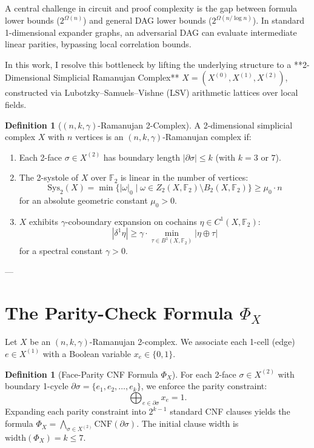 \documentclass[11pt,a4paper]{article}
\theoremstyle{plain}
\theoremstyle{definition}
\newtheorem{definition}[theorem]{Definition}
\theoremstyle{remark}
\begin{document}
A central challenge in circuit and proof complexity is the gap between formula lower bounds ($2^{\Omega(n)}$) and general DAG lower bounds ($2^{\Omega(n / \log n)}$). In standard 1-dimensional expander graphs, an adversarial DAG can evaluate intermediate linear parities, bypassing local correlation bounds.

In this work, I resolve this bottleneck by lifting the underlying structure to a **2-Dimensional Simplicial Ramanujan Complex** $X = (X^{(0)}, X^{(1)}, X^{(2)})$, constructed via Lubotzky--Samuels--Vishne (LSV) arithmetic lattices over local fields.

\begin{definition}[$(n, k, \gamma)$-Ramanujan 2-Complex]
A 2-dimensional simplicial complex $X$ with $n$ vertices is an $(n, k, \gamma)$-Ramanujan complex if:
\begin{enumerate}
    \item Each 2-face $\sigma \in X^{(2)}$ has boundary length $|\partial \sigma| \le k$ (with $k=3$ or $7$).
    \item The 2-systole of $X$ over $\mathbb{F}_2$ is linear in the number of vertices:
    \[
    \mathrm{Sys}_2(X) = \min \{ |\omega|_0 \mid \omega \in Z_2(X, \mathbb{F}_2) \setminus B_2(X, \mathbb{F}_2) \} \ge \mu_0 \cdot n
    \]
    for an absolute geometric constant $\mu_0 > 0$.
    \item $X$ exhibits $\gamma$-coboundary expansion on cochains $\eta \in C^1(X, \mathbb{F}_2)$:
    \[
    |\delta^1 \eta| \ge \gamma \cdot \min_{\tau \in B^1(X, \mathbb{F}_2)} |\eta \oplus \tau|
    \]
    for a spectral constant $\gamma > 0$.
\end{enumerate}
\end{definition}

---

\section{The Parity-Check Formula $\Phi_X$}

Let $X$ be an $(n, k, \gamma)$-Ramanujan 2-complex. We associate each 1-cell (edge) $e \in X^{(1)}$ with a Boolean variable $x_e \in \{0, 1\}$.

\begin{definition}[Face-Parity CNF Formula $\Phi_X$]
For each 2-face $\sigma \in X^{(2)}$ with boundary 1-cycle $\partial \sigma = \{e_1, e_2, \dots, e_k\}$, we enforce the parity constraint:
\[
\bigoplus_{e \in \partial \sigma} x_e = 1.
\]
Expanding each parity constraint into $2^{k-1}$ standard CNF clauses yields the formula $\Phi_X = \bigwedge_{\sigma \in X^{(2)}} \mathrm{CNF}(\partial \sigma)$. The initial clause width is $\mathrm{width}(\Phi_X) = k \le 7$.
\end{definition}
\end{document}
